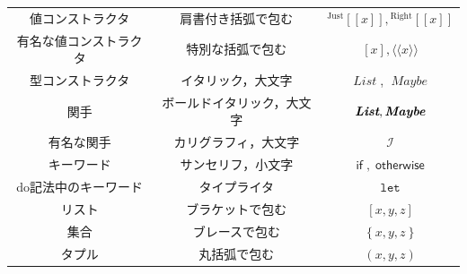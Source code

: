 \documentclass[a4paper,twocolumn]{jsbook}
\def\[{\left[\!\left[}
\def\]{\right]\!\right]}
\newcommand{\Langle}{\langle\!\langle}
\newcommand{\Rangle}{\rangle\!\rangle}
\newcommand{\mKeyword}[1]{\mathsf{#1}} %
\newcommand{\mVarKeyword}[1]{\texttt{#1}} %
\newcommand{\mDoLetKeyword}{\mVarKeyword{let}}
\newcommand{\mIfKeyword}{\mKeyword{if}}
\newcommand{\mOtherwiseKeyword}{\mKeyword{otherwise}}
\DeclareMathOperator{\mIf}{\mIfKeyword}
\DeclareMathOperator{\mOtherwise}{\mOtherwiseKeyword}
\newcommand{\mSpecialSub}[1]{\text{#1}}
\newcommand{\mRight}{\mSpecialSub{Right}}
\newcommand{\mTypeConstructor}[1]{\textit{#1}}
\DeclareMathOperator{\mListTypeConstructor}{\mTypeConstructor{List}}
\DeclareMathOperator{\mMaybeTypeConstructor}{\mTypeConstructor{Maybe}}
\newcommand{\mGenericValueConstructor}[1]{\mathrm{#1}}
\newcommand{\mGenericWith}[2]{{}^\mGenericValueConstructor{#1}\[#2\]}
\newcommand{\mRightWith}[1]{\mGenericWith{\mRight}{#1}}
\newcommand{\mJustWith}[1]{\mGenericWith{Just}{#1}}
\newcommand{\mFuncWith}[1]{\Langle#1\Rangle}
\newcommand{\mListWith}[1]{\left[#1\right]}
\newcommand{\mSetWith}[1]{\left\{#1\right\}}
\newcommand{\mTupleWith}[1]{\left(#1\right)}
\newcommand{\mTupleUnboxedWith}[1]{\texttt{(\#}#1\texttt{\#)}}
\newcommand{\mFunctor}[1]{\textit{\textbf{#1}}}
\newcommand{\mSpecialFunctor}[1]{\mathcal{#1}} %
\DeclareMathOperator{\mIFunctor}{\mSpecialFunctor{I}}
\begin{document}
\begin{table}[p]
\begin{center}
\begin{tabular}{||c|c|c||}
\hline
値コンストラクタ&肩書付き括弧で包む&$\mJustWith{x},\mRightWith{x}$\\
有名な値コンストラクタ&特別な括弧で包む&$\mListWith{x},\mFuncWith{x}$\\
\hline
型コンストラクタ&イタリック，大文字&$\mListTypeConstructor$, $\mMaybeTypeConstructor$\\
関手&ボールドイタリック，大文字&$\mFunctor{List},\mFunctor{Maybe}$\\
有名な関手&カリグラフィ，大文字&$\mIFunctor$\\
\hline
キーワード&サンセリフ，小文字&$\mIf,\mOtherwise$\\
do記法中のキーワード&タイプライタ&$\mDoLetKeyword$\\
\hline
リスト&ブラケットで包む&$\mListWith{x,y,z}$\\
集合&ブレースで包む&$\mSetWith{x,y,z}$\\
タプル&丸括弧で包む&$\mTupleWith{x,y,z}$\\
\hline
\end{tabular}
\end{center}
\end{table}
\end{document}
